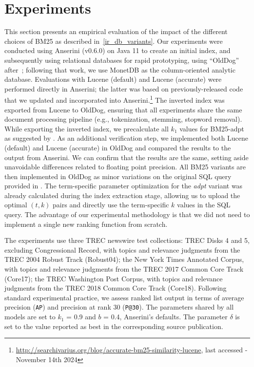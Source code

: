 \section{Experiments}
This section presents an empirical evaluation of the impact of the different choices of BM25 as described in~\cref{ir_db_variants}.
Our experiments were conducted using Anserini (v0.6.0) on Java 11 to create an initial index, and subsequently using relational databases for rapid prototyping, using ``OldDog''~\citep{olddog-docker} after~\citet{OldDog}; following that work, we use MonetDB as the column-oriented analytic database. Evaluations with Lucene (default) and Lucene (accurate) were performed directly in Anserini; the latter was based on previously-released code that we updated and incorporated into Anserini.\footnote{\url{http://searchivarius.org/blog/accurate-bm25-similarity-lucene}, last accessed - November 14th 2024} The inverted index was exported from Lucene to OldDog, ensuring that all experiments share the same document processing pipeline (e.g., tokenization, stemming, stopword removal). While exporting the inverted index, we precalculate all $k_1$ values for BM25-adpt as suggested by \citet{bm25-adpt}. As an additional verification step, we implemented both Lucene (default) and Lucene (accurate) in OldDog and compared the results to the output from Anserini. We can confirm that the results are the same, setting aside unavoidable differences related to floating point precision. All BM25 variants are then implemented in OldDog as minor variations on the original SQL query provided in \citet{OldDog}. The term-specific parameter optimization for the \emph{adpt} variant was already calculated during the index extraction stage, allowing us to upload the optimal $(t, k)$ pairs and directly use the term-specific $k$ values in the SQL query. The advantage of our experimental methodology is that we did not need to implement a single new ranking function from scratch.

The experiments use three TREC newswire test collections: TREC Disks 4 and 5, excluding Congressional Record, with topics and relevance judgments from the TREC 2004 Robust Track (Robust04); the New York Times Annotated Corpus, with topics and relevance judgments from the TREC 2017 Common Core Track (Core17); the TREC Washington Post Corpus, with topics and relevance judgments from the TREC 2018 Common Core Track (Core18). Following standard experimental practice, we assess ranked list output in terms of average precision (\texttt{AP}) and precision at rank 30 (\texttt{P@30}). The parameters shared by all models are set to $k_1$ = 0.9 and $b$ = 0.4, Anserini’s defaults. The parameter $\delta$ is set to the value reported as best in the corresponding source publication. 

